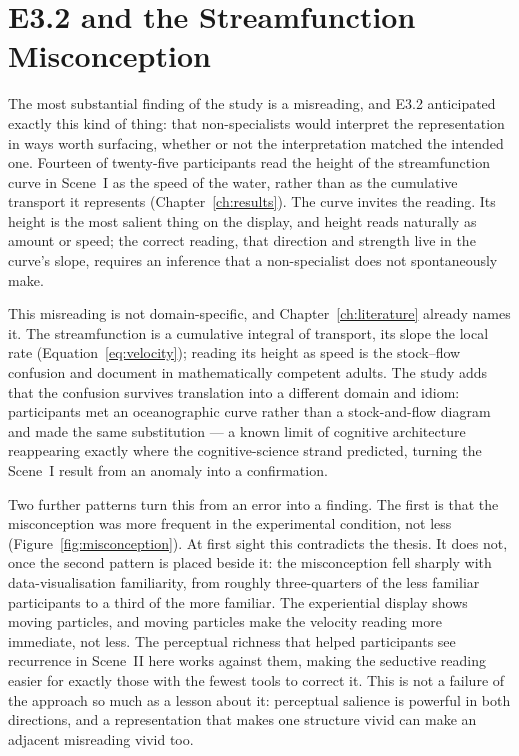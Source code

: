 \section{E3.2 and the Streamfunction Misconception}
\label{sec:disc-e32}

The most substantial finding of the study is a misreading, and E3.2 anticipated exactly this kind of thing: that non-specialists would interpret the representation in ways worth surfacing, whether or not the interpretation matched the intended one. Fourteen of twenty-five participants read the height of the streamfunction curve in Scene~I as the speed of the water, rather than as the cumulative transport it represents (Chapter~\ref{ch:results}). The curve invites the reading. Its height is the most salient thing on the display, and height reads naturally as amount or speed; the correct reading, that direction and strength live in the curve's slope, requires an inference that a non-specialist does not spontaneously make.

This misreading is not domain-specific, and Chapter~\ref{ch:literature} already names it. The streamfunction is a cumulative integral of transport, its slope the local rate (Equation~\ref{eq:velocity}); reading its height as speed is the stock--flow confusion \textcite{sterman2008} and \textcite{cronin2009} document in mathematically competent adults. The study adds that the confusion survives translation into a different domain and idiom: participants met an oceanographic curve rather than a stock-and-flow diagram and made the same substitution --- a known limit of cognitive architecture reappearing exactly where the cognitive-science strand predicted, turning the Scene~I result from an anomaly into a confirmation.

Two further patterns turn this from an error into a finding. The first is that the misconception was more frequent in the experimental condition, not less (Figure~\ref{fig:misconception}). At first sight this contradicts the thesis. It does not, once the second pattern is placed beside it: the misconception fell sharply with data-visualisation familiarity, from roughly three-quarters of the less familiar participants to a third of the more familiar. The experiential display shows moving particles, and moving particles make the velocity reading more immediate, not less. The perceptual richness that helped participants see recurrence in Scene~II here works against them, making the seductive reading easier for exactly those with the fewest tools to correct it. This is not a failure of the approach so much as a lesson about it: perceptual salience is powerful in both directions, and a representation that makes one structure vivid can make an adjacent misreading vivid too.

